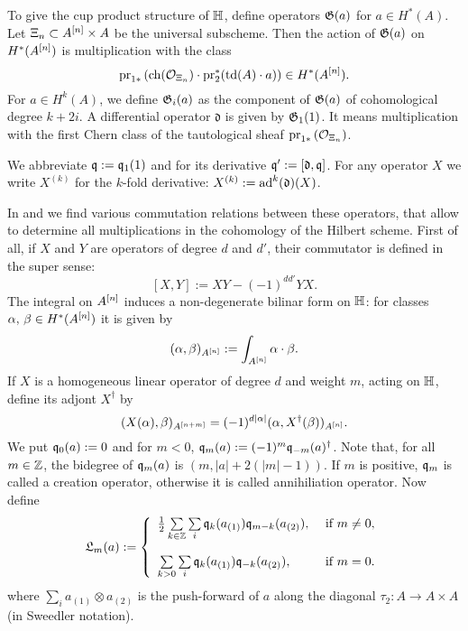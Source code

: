 \begin{definition}
To give the cup product structure of $\mathbb{H}$, define operators $\mathfrak{G}(a)$ for $a \in H^*(A)$. Let $\Xi_n \subset A^{[n]}\times A$ be the universal subscheme. Then the action of $\mathfrak{G}(a)$ on $H^*(A^{[n]})$ is multiplication with the class
$$
\operatorname{pr}_{1*}\left( \operatorname{ch}(\mathcal{O}_{\Xi_n})\cdot \operatorname{pr}_2^*(\operatorname{td}(A)\cdot a) \right) \in H^*(A^{[n]}).
$$
For $a \in H^k(A)$, we define $\mathfrak{G}_i(a)$ as the component of $\mathfrak{G}(a)$ of cohomological degree $k+2i$. A differential operator $\mathfrak{d}$ is given by $\mathfrak{G}_1(1)$. It means multiplication with the first Chern class of the tautological sheaf $\operatorname{pr}_{1*}\left( \mathcal{O}_{\Xi_n}\right)$.
\end{definition}
\begin{notation} 
We abbreviate $\mathfrak{q} := \mathfrak{q}_1(1)$ and for its derivative $\mathfrak{q}':= [\mathfrak d, \mathfrak{q}]$. For any operator $X$ we write $X^{(k)}$ for the $k$-fold derivative: $X^{(k)} :=\operatorname{ad}^k(\mathfrak{d}) (X)$.
\end{notation}
In \cite{LehnSorger} and \cite{LiQinWang} we find various commutation relations between these operators, that allow to determine all multiplications in the cohomology of the Hilbert scheme. First of all, if $X$ and $Y$ are operators of degree $d$ and $d'$, their commutator is defined in the super sense: 
$$
[X,Y] := XY - (-1)^{dd'}YX.
$$
The integral on $A^{[n]}$ induces a non-degenerate bilinar form on $\mathbb{H}$: for classes $\alpha,\,\beta\in H^*(A^{[n]})$ it is given by
$$
(\alpha,\beta)_{A^{[n]}} :=  \int_{A^{[n]}}\alpha\cdot\beta.
$$
If $X$ is a homogeneous linear operator of degree $d$ and weight $m$, acting on $\mathbb{H}$, define its adjont $X^\dagger$ by
$$
(X(\alpha),\beta)_{A^{[n+m]}}  = (-1)^{d|\alpha|}( \alpha , X^\dagger (\beta))_{A^{[n]}}.
$$
We put $\mathfrak{q}_0(a) :=0$ and for $m<0$, $\mathfrak{q}_m(a) := (-1)^m \mathfrak{q}_{-m}(a)^\dagger$. Note that, for all $m\in\mathbb{Z}$, the bidegree of $\mathfrak{q}_m(a)$ is $(m,|a| + 2(|m|-1))$. If $m$ is positive, $\mathfrak{q}_m$ is called a creation operator, otherwise it is called annihiliation operator. Now define
$$
\mathfrak{L}_m(a) := \left\{ 
\begin{array}{ll}
 \tfrac{1}{2}\sum\limits_{k\in\Z}\sum\limits_{i}\q_k( a_{(1)})\q_{m-k}( a_{(2)}), & \text{ if } m\neq 0, \vspace{4mm}\\
 \sum\limits_{k>0}\sum\limits_{i}\q_k( a_{(1)})\q_{-k}( a_{(2)}), & \text{ if } m= 0. \\
\end{array}
\right.
$$
where $\sum_i a_{(1)}\otimes  a_{(2)}$ is the push-forward of $a$ along the diagonal $\tau_2 :A \rightarrow A\times A$ (in Sweedler notation).
